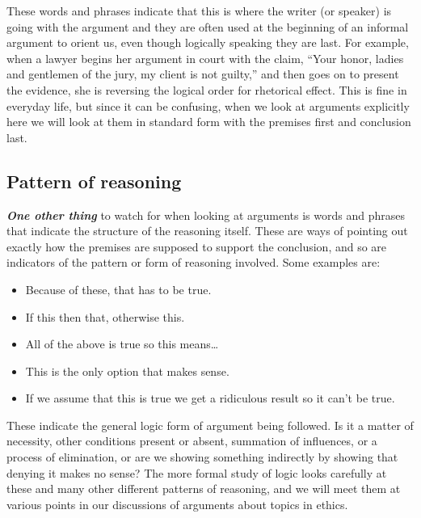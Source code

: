 \documentclass[12pt, openany]{book}
\makeatletter
\providecommand{\tightlist}{%
  \setlength{\itemsep}{0pt}\setlength{\parskip}{0pt}}
\newenvironment{kframe}{%
\medskip{}
\setlength{\fboxsep}{.8em}
 \def\at@end@of@kframe{}%
 \ifinner\ifhmode%
  \def\at@end@of@kframe{\end{minipage}}%
  \begin{minipage}{\columnwidth}%
 \fi\fi%
 \def\FrameCommand##1{\hskip\@totalleftmargin \hskip-\fboxsep
 \colorbox{shadecolor}{##1}\hskip-\fboxsep
     \hskip-\linewidth \hskip-\@totalleftmargin \hskip\columnwidth}%
 \MakeFramed {\advance\hsize-\width
   \@totalleftmargin\z@ \linewidth\hsize
   \@setminipage}}%
 {\par\unskip\endMakeFramed%
 \at@end@of@kframe}
\newenvironment{rmdblock}[1]
  {
  \begin{itemize}
  \renewcommand{\labelitemi}{
    \raisebox{-.7\height}[0pt][0pt]{
      {\setkeys{Gin}{width=3em,keepaspectratio}\texttt{[image: img/\#1]}}
    }
  }
  \setlength{\fboxsep}{1em}
  \begin{kframe}
  \item
  }
  {
  \end{kframe}
  \end{itemize}
  }
\newenvironment{note}
  {\begin{rmdblock}{note}}
  {\end{rmdblock}}
\makeatother
\begin{document}
These words and phrases indicate that this is where the writer (or speaker) is going with the argument and they are often used at the beginning of an informal argument to orient us, even though logically speaking they are last. For example, when a lawyer begins her argument in court with the claim, ``Your honor, ladies and gentlemen of the jury, my client is not guilty,'' and then goes on to present the evidence, she is reversing the logical order for rhetorical effect. This is fine in everyday life, but since it can be confusing, when we look at arguments explicitly here we will look at them in standard form with the premises first and conclusion last.

\hypertarget{pattern-of-reasoning}{%
\subsection*{Pattern of reasoning}\label{pattern-of-reasoning}}


\textbf{\emph{One other thing}} to watch for when looking at arguments is words and phrases that indicate the structure of the reasoning itself. These are ways of pointing out exactly how the premises are supposed to support the conclusion, and so are indicators of the pattern or form of reasoning involved. Some examples are:

\begin{note}

\begin{itemize}
\tightlist
\item
  Because of these, that has to be true.
\item
  If this then that, otherwise this.
\item
  All of the above is true so this means\ldots{}
\item
  This is the only option that makes sense.
\item
  If we assume that this is true we get a ridiculous result so it can't be true.
\end{itemize}

\end{note}

These indicate the general logic form of argument being followed. Is it a matter of necessity, other conditions present or absent, summation of influences, or a process of elimination, or are we showing something indirectly by showing that denying it makes no sense? The more formal study of logic looks carefully at these and many other different patterns of reasoning, and we will meet them at various points in our discussions of arguments about topics in ethics.
\end{document}

